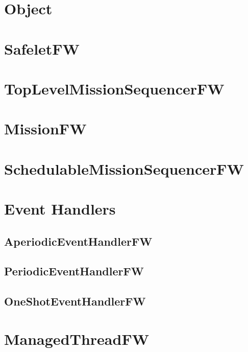 \documentclass{article}
\begin{document}
\section{Object}

\newpage

\section{SafeletFW}

\newpage

\section{TopLevelMissionSequencerFW}

\newpage

\section{MissionFW}

\newpage

\section{SchedulableMissionSequencerFW}

\newpage

\section{Event Handlers}
\subsection{AperiodicEventHandlerFW}

\newpage

\subsection{PeriodicEventHandlerFW}

\newpage

\subsection{OneShotEventHandlerFW}

\newpage

\section{ManagedThreadFW}

\newpage
\end{document}
